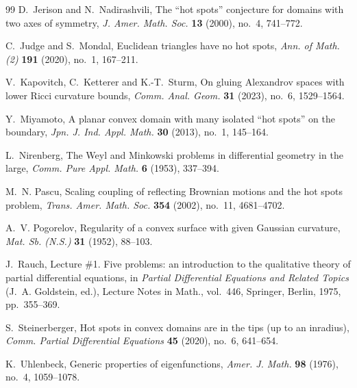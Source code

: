 \documentclass[11pt]{amsart}
\numberwithin{equation}{section}
\begin{document}
\begin{thebibliography}{99}
D.~Jerison and N.~Nadirashvili,
\newblock The ``hot spots'' conjecture for domains with two axes of symmetry,
\newblock \emph{J. Amer. Math. Soc.} \textbf{13} (2000), no.~4, 741--772.

C.~Judge and S.~Mondal,
\newblock Euclidean triangles have no hot spots,
\newblock \emph{Ann. of Math. (2)} \textbf{191} (2020), no.~1, 167--211.

V.~Kapovitch, C.~Ketterer and K.-T.~Sturm,
\newblock On gluing Alexandrov spaces with lower Ricci curvature bounds,
\newblock \emph{Comm. Anal. Geom.} \textbf{31} (2023), no.~6, 1529--1564.

Y.~Miyamoto,
\newblock A planar convex domain with many isolated ``hot spots'' on the boundary,
\newblock \emph{Jpn. J. Ind. Appl. Math.} \textbf{30} (2013), no.~1,
145--164.

L.~Nirenberg,
\newblock The Weyl and Minkowski problems in differential geometry in the large,
\newblock \emph{Comm. Pure Appl. Math.} \textbf{6} (1953), 337--394.

M.~N. Pascu,
\newblock Scaling coupling of reflecting Brownian motions and the hot spots problem,
\newblock \emph{Trans. Amer. Math. Soc.} \textbf{354} (2002), no.~11,
4681--4702.

A.~V. Pogorelov,
\newblock Regularity of a convex surface with given Gaussian curvature,
\newblock \emph{Mat. Sb. (N.S.)} \textbf{31} (1952), 88--103.

J.~Rauch,
\newblock Lecture \#1. Five problems: an introduction to the qualitative theory of
partial differential equations,
\newblock in \emph{Partial Differential Equations and Related Topics}
(J.~A. Goldstein, ed.), Lecture Notes in Math., vol.~446, Springer, Berlin,
1975, pp.~355--369.

S.~Steinerberger,
\newblock Hot spots in convex domains are in the tips (up to an inradius),
\newblock \emph{Comm. Partial Differential Equations} \textbf{45} (2020),
no.~6, 641--654.


K.~Uhlenbeck,
\newblock Generic properties of eigenfunctions,
\newblock \emph{Amer. J. Math.} \textbf{98} (1976), no.~4, 1059--1078.




\end{thebibliography}
\end{document}
